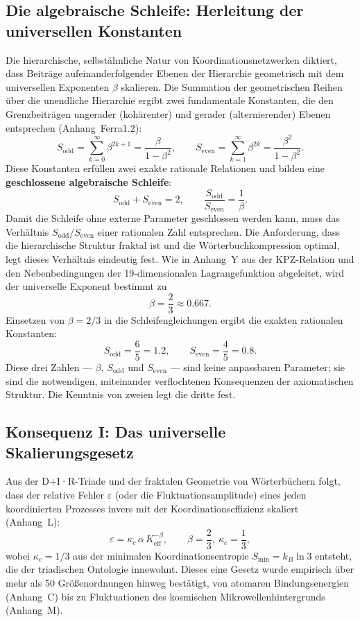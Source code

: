 \documentclass[11pt,a4paper]{article}
\begin{document}
	\subsection{Die algebraische Schleife: Herleitung der universellen Konstanten}
	\label{subsec:algebraic-loop}
	
	Die hierarchische, selbstähnliche Natur von Koordinationsnetzwerken diktiert, dass Beiträge aufeinanderfolgender Ebenen der Hierarchie geometrisch mit dem universellen Exponenten \(\beta\) skalieren. Die Summation der geometrischen Reihen über die unendliche Hierarchie ergibt zwei fundamentale Konstanten, die den Grenzbeiträgen ungerader (kohärenter) und gerader (alternierender) Ebenen entsprechen (Anhang~Ferra1.2):
	\[
	S_{\mathrm{odd}} = \sum_{k=0}^{\infty} \beta^{2k+1} = \frac{\beta}{1-\beta^{2}}, \qquad
	S_{\mathrm{even}} = \sum_{k=1}^{\infty} \beta^{2k} = \frac{\beta^{2}}{1-\beta^{2}}.
	\]
	Diese Konstanten erfüllen zwei exakte rationale Relationen und bilden eine \textbf{geschlossene algebraische Schleife}:
	\[
	\boxed{S_{\mathrm{odd}} + S_{\mathrm{even}} = 2, \qquad \frac{S_{\mathrm{odd}}}{S_{\mathrm{even}}} = \frac{1}{\beta}}.
	\]
	Damit die Schleife ohne externe Parameter geschlossen werden kann, muss das Verhältnis \(S_{\mathrm{odd}}/S_{\mathrm{even}}\) einer rationalen Zahl entsprechen. Die Anforderung, dass die hierarchische Struktur fraktal ist und die Wörterbuchkompression optimal, legt dieses Verhältnis eindeutig fest. Wie in Anhang~Y aus der KPZ-Relation und den Nebenbedingungen der 19-dimensionalen Lagrangefunktion abgeleitet, wird der universelle Exponent bestimmt zu
	\[
	\beta = \frac{2}{3} \approx 0.667.
	\]
	Einsetzen von \(\beta = 2/3\) in die Schleifengleichungen ergibt die exakten rationalen Konstanten:
	\[
	S_{\mathrm{odd}} = \frac{6}{5} = 1.2,\qquad S_{\mathrm{even}} = \frac{4}{5} = 0.8.
	\]
	Diese drei Zahlen — \(\beta\), \(S_{\mathrm{odd}}\) und \(S_{\mathrm{even}}\) — sind keine anpassbaren Parameter; sie sind die notwendigen, miteinander verflochtenen Konsequenzen der axiomatischen Struktur. Die Kenntnis von zweien legt die dritte fest.
	
	\subsection{Konsequenz I: Das universelle Skalierungsgesetz}
	\label{subsec:consequence-scaling}
	
	Aus der D+I·R-Triade und der fraktalen Geometrie von Wörterbüchern folgt, dass der relative Fehler \(\varepsilon\) (oder die Fluktuationsamplitude) eines jeden koordinierten Prozesses invers mit der Koordinationseffizienz skaliert (Anhang~L):
	\[
	\boxed{\varepsilon = \kappa_c \, \alpha \, K_{\mathrm{eff}}^{-\beta}, \qquad \beta = \frac{2}{3},\ \kappa_c = \frac{1}{3}},
	\]
	wobei \(\kappa_c = 1/3\) aus der minimalen Koordinationsentropie \(S_{\min} = k_B \ln 3\) entsteht, die der triadischen Ontologie innewohnt. Dieses eine Gesetz wurde empirisch über mehr als 50 Größenordnungen hinweg bestätigt, von atomaren Bindungsenergien (Anhang~C) bis zu Fluktuationen des kosmischen Mikrowellenhintergrunds (Anhang~M).
	
\end{document}
